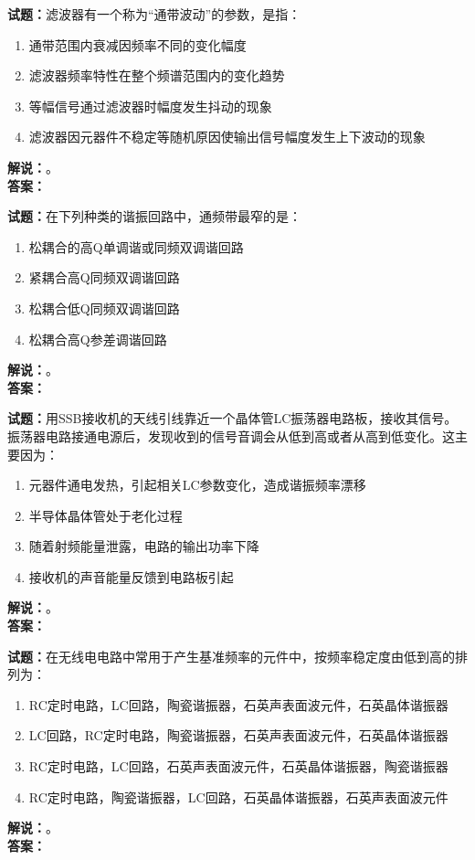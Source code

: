 \documentclass{ctexbook}
\begin{document}
\bigskip

\noindent\textbf{试题：}滤波器有一个称为“通带波动”的参数，是指：
\begin{enumerate}[leftmargin=3em]
  \item 通带范围内衰减因频率不同的变化幅度
  \item 滤波器频率特性在整个频谱范围内的变化趋势
  \item 等幅信号通过滤波器时幅度发生抖动的现象
  \item 滤波器因元器件不稳定等随机原因使输出信号幅度发生上下波动的现象
\end{enumerate}
\noindent\textbf{解说：}\textbf{}。\\\noindent\textbf{答案：}

\bigskip

\noindent\textbf{试题：}在下列种类的谐振回路中，通频带最窄的是：
\begin{enumerate}[leftmargin=3em]
  \item 松耦合的高Q单调谐或同频双调谐回路
  \item 紧耦合高Q同频双调谐回路
  \item 松耦合低Q同频双调谐回路
  \item 松耦合高Q参差调谐回路
\end{enumerate}
\noindent\textbf{解说：}\textbf{}。\\\noindent\textbf{答案：}

\bigskip

\noindent\textbf{试题：}用SSB接收机的天线引线靠近一个晶体管LC振荡器电路板，接收其信号。振荡器电路接通电源后，发现收到的信号音调会从低到高或者从高到低变化。这主要因为：
\begin{enumerate}[leftmargin=3em]
  \item 元器件通电发热，引起相关LC参数变化，造成谐振频率漂移
  \item 半导体晶体管处于老化过程
  \item 随着射频能量泄露，电路的输出功率下降
  \item 接收机的声音能量反馈到电路板引起
\end{enumerate}
\noindent\textbf{解说：}\textbf{}。\\\noindent\textbf{答案：}

\bigskip

\noindent\textbf{试题：}在无线电电路中常用于产生基准频率的元件中，按频率稳定度由低到高的排列为：
\begin{enumerate}[leftmargin=3em]
  \item RC定时电路，LC回路，陶瓷谐振器，石英声表面波元件，石英晶体谐振器
  \item LC回路，RC定时电路，陶瓷谐振器，石英声表面波元件，石英晶体谐振器
  \item RC定时电路，LC回路，石英声表面波元件，石英晶体谐振器，陶瓷谐振器
  \item RC定时电路，陶瓷谐振器，LC回路，石英晶体谐振器，石英声表面波元件
\end{enumerate}
\noindent\textbf{解说：}\textbf{}。\\\noindent\textbf{答案：}
\end{document}
